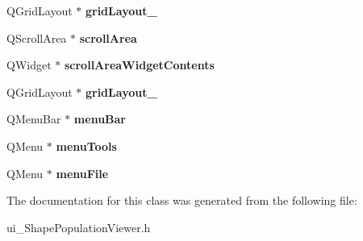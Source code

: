 \begin{DoxyCompactItemize}
\item 
\hypertarget{class_ui___shape_population_viewer_a13b301d656b77abbf223d490f24c05f3}{Q\-Grid\-Layout $\ast$ {\bfseries grid\-Layout\-\_}}\label{class_ui___shape_population_viewer_a13b301d656b77abbf223d490f24c05f3}

\item 
\hypertarget{class_ui___shape_population_viewer_a4321ba9527394aa5dd0ea86904e5c079}{Q\-Scroll\-Area $\ast$ {\bfseries scroll\-Area}}\label{class_ui___shape_population_viewer_a4321ba9527394aa5dd0ea86904e5c079}

\item 
\hypertarget{class_ui___shape_population_viewer_ad4285cc74892781f0419c5efa53a4663}{Q\-Widget $\ast$ {\bfseries scroll\-Area\-Widget\-Contents}}\label{class_ui___shape_population_viewer_ad4285cc74892781f0419c5efa53a4663}

\item 
\hypertarget{class_ui___shape_population_viewer_a23ea5087f7f5c64a93f0f73f0272e143}{Q\-Grid\-Layout $\ast$ {\bfseries grid\-Layout\-\_}}\label{class_ui___shape_population_viewer_a23ea5087f7f5c64a93f0f73f0272e143}

\item 
\hypertarget{class_ui___shape_population_viewer_a62491d50e5e5da4a1253417b27fa9af8}{Q\-Menu\-Bar $\ast$ {\bfseries menu\-Bar}}\label{class_ui___shape_population_viewer_a62491d50e5e5da4a1253417b27fa9af8}

\item 
\hypertarget{class_ui___shape_population_viewer_a643fe8b0da014e88840718671ee9d360}{Q\-Menu $\ast$ {\bfseries menu\-Tools}}\label{class_ui___shape_population_viewer_a643fe8b0da014e88840718671ee9d360}

\item 
\hypertarget{class_ui___shape_population_viewer_a3e1f6eece1982ca2e0ecfea1fe60389e}{Q\-Menu $\ast$ {\bfseries menu\-File}}\label{class_ui___shape_population_viewer_a3e1f6eece1982ca2e0ecfea1fe60389e}

\end{DoxyCompactItemize}


The documentation for this class was generated from the following file\-:\begin{DoxyCompactItemize}
\item 
ui\-\_\-\-Shape\-Population\-Viewer.\-h\end{DoxyCompactItemize}
